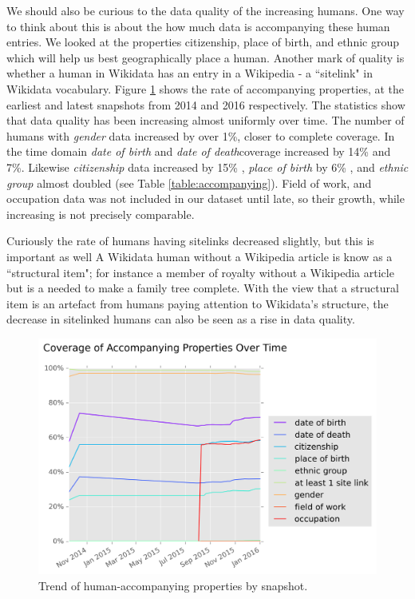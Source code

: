\documentclass[letterpaper]{article}
\begin{document}
We should also be curious to the data quality of the increasing humans. One way to think about this is about the how much data is accompanying these human entries. We looked at the properties citizenship, place of birth, and ethnic group which will help us best geographically place a human. Another mark of quality is whether a human in Wikidata has an entry in a Wikipedia - a ``sitelink" in Wikidata vocabulary. Figure \ref{fig:accompanying} shows the rate of accompanying properties, at the earliest and latest snapshots from 2014 and 2016 respectively. The statistics show that data quality has been increasing almost uniformly over time. The number of humans with \textit{gender} data increased by over 1\%, closer to complete coverage. In the time domain \textit{date of birth} and \textit{date of death}coverage increased by 14\% and 7\%. Likewise \textit{citizenship} data increased by 15\% , \textit{place of birth} by 6\% , and \textit{ethnic group} almost doubled (see Table \ref{table:accompanying}). Field of work, and occupation data was not included in our dataset until late, so their growth, while increasing is not precisely comparable.

Curiously the rate of humans having sitelinks decreased slightly, but this is important as well A Wikidata human without a Wikipedia article is know as a ``structural item"; for instance a member of royalty without a Wikipedia article but is a needed to make a family tree complete. With the view that a structural item is an artefact from humans paying attention to Wikidata's structure, the decrease in sitelinked humans can also be seen as a rise in data quality.


\begin{figure}
\label{fig:accompanying}
\includegraphics[scale=0.5]{figures/additionalprops.png} 
\caption{Trend of human-accompanying properties by snapshot.}
\end{figure}
\end{document}
